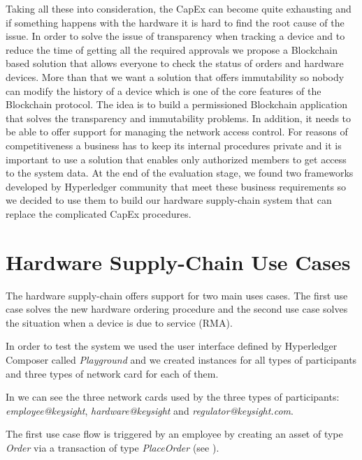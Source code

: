 Taking all these into consideration, the CapEx can become quite exhausting and if something happens with the hardware it is hard to find the root cause of the issue. In order to solve the issue of transparency when tracking a device and to reduce the time of getting all the required approvals we propose a Blockchain based solution that allows everyone to check the status of orders and hardware devices. More than that we want a solution that offers immutability so nobody can modify the history of a device which is one of the core features of the Blockchain protocol.
The idea is to build a permissioned Blockchain application that solves the transparency and immutability problems. In addition, it needs to be able to offer support for managing the network access control.
For reasons of competitiveness a business has to keep its internal procedures private and it is important to use a solution that enables only authorized members to get access to the system data.
At the end of the evaluation stage, we found two frameworks developed by Hyperledger community that meet these business requirements so we decided to use them to build our hardware supply-chain system that can replace the complicated CapEx  procedures.

\section{Hardware Supply-Chain Use Cases}
\label{sec:chapter4-section2}
The hardware supply-chain offers support for two main uses cases. The first use case solves the new hardware ordering procedure and the second use case solves the situation when a device is due to service (RMA).

In order to test the {\project} system we used the user interface defined by Hyperledger Composer called \emph{Playground} \cite{composer-playground} and we created instances for all types of participants and three types of network card for each of them. 

In  we can see the three network cards used by the three types of participants: \emph{employee@keysight}, \emph{hardware@keysight} and \emph{regulator@keysight.com}.


The first use case flow is triggered by an employee by creating an asset of type \emph{Order} via a transaction of type \emph{PlaceOrder} (see ). 

